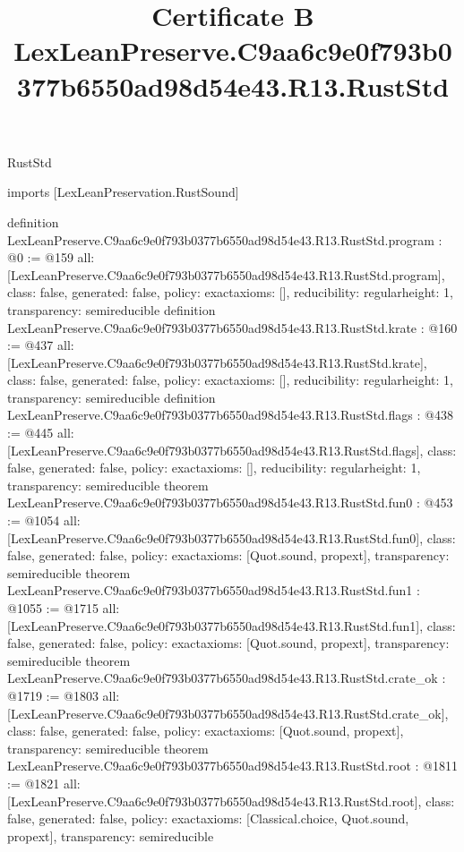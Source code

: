 \begin{lexlean}{RustStd}
\title{Certificate B LexLeanPreserve.C9aa6c9e0f793b0377b6550ad98d54e43.R13.RustStd}
\begin{coremodule}
imports [LexLeanPreservation.RustSound]

definition LexLeanPreserve.C9aa6c9e0f793b0377b6550ad98d54e43.R13.RustStd.program : @0 := @159 {
  all: [LexLeanPreserve.C9aa6c9e0f793b0377b6550ad98d54e43.R13.RustStd.program],
  class: false,
  generated: false,
  policy: exact{axioms: []},
  reducibility: regular{height: 1},
  transparency: semireducible
}
definition LexLeanPreserve.C9aa6c9e0f793b0377b6550ad98d54e43.R13.RustStd.krate : @160 := @437 {
  all: [LexLeanPreserve.C9aa6c9e0f793b0377b6550ad98d54e43.R13.RustStd.krate],
  class: false,
  generated: false,
  policy: exact{axioms: []},
  reducibility: regular{height: 1},
  transparency: semireducible
}
definition LexLeanPreserve.C9aa6c9e0f793b0377b6550ad98d54e43.R13.RustStd.flags : @438 := @445 {
  all: [LexLeanPreserve.C9aa6c9e0f793b0377b6550ad98d54e43.R13.RustStd.flags],
  class: false,
  generated: false,
  policy: exact{axioms: []},
  reducibility: regular{height: 1},
  transparency: semireducible
}
theorem LexLeanPreserve.C9aa6c9e0f793b0377b6550ad98d54e43.R13.RustStd.fun0 : @453 := @1054 {
  all: [LexLeanPreserve.C9aa6c9e0f793b0377b6550ad98d54e43.R13.RustStd.fun0],
  class: false,
  generated: false,
  policy: exact{axioms: [Quot.sound, propext]},
  transparency: semireducible
}
theorem LexLeanPreserve.C9aa6c9e0f793b0377b6550ad98d54e43.R13.RustStd.fun1 : @1055 := @1715 {
  all: [LexLeanPreserve.C9aa6c9e0f793b0377b6550ad98d54e43.R13.RustStd.fun1],
  class: false,
  generated: false,
  policy: exact{axioms: [Quot.sound, propext]},
  transparency: semireducible
}
theorem LexLeanPreserve.C9aa6c9e0f793b0377b6550ad98d54e43.R13.RustStd.crate_ok : @1719 := @1803 {
  all: [LexLeanPreserve.C9aa6c9e0f793b0377b6550ad98d54e43.R13.RustStd.crate_ok],
  class: false,
  generated: false,
  policy: exact{axioms: [Quot.sound, propext]},
  transparency: semireducible
}
theorem LexLeanPreserve.C9aa6c9e0f793b0377b6550ad98d54e43.R13.RustStd.root : @1811 := @1821 {
  all: [LexLeanPreserve.C9aa6c9e0f793b0377b6550ad98d54e43.R13.RustStd.root],
  class: false,
  generated: false,
  policy: exact{axioms: [Classical.choice, Quot.sound, propext]},
  transparency: semireducible
}


\end{coremodule}
\end{lexlean}
